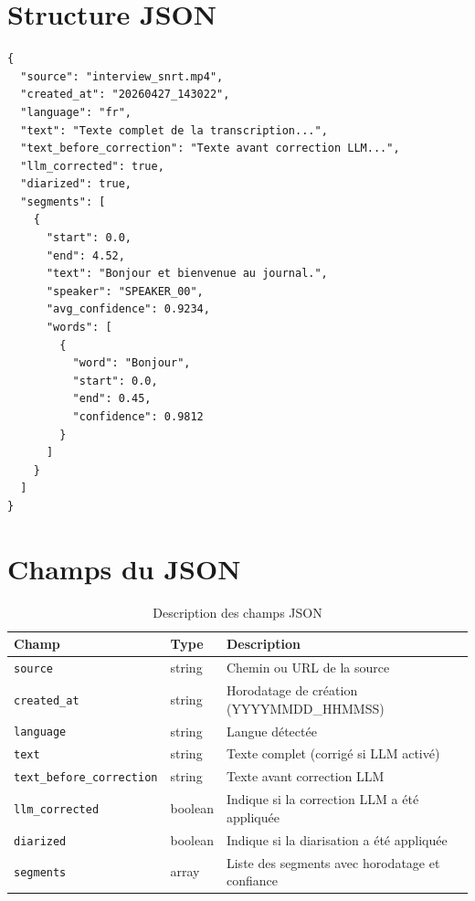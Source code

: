 \documentclass[12pt,a4paper]{report}
\begin{document}
\section{Structure JSON}

\begin{lstlisting}[title=Exemple de fichier JSON de sortie]
{
  "source": "interview_snrt.mp4",
  "created_at": "20260427_143022",
  "language": "fr",
  "text": "Texte complet de la transcription...",
  "text_before_correction": "Texte avant correction LLM...",
  "llm_corrected": true,
  "diarized": true,
  "segments": [
    {
      "start": 0.0,
      "end": 4.52,
      "text": "Bonjour et bienvenue au journal.",
      "speaker": "SPEAKER_00",
      "avg_confidence": 0.9234,
      "words": [
        {
          "word": "Bonjour",
          "start": 0.0,
          "end": 0.45,
          "confidence": 0.9812
        }
      ]
    }
  ]
}
\end{lstlisting}

\section{Champs du JSON}

\begin{table}[H]
    \centering
    \caption{Description des champs JSON}
    \label{tab:json_fields}
    \begin{tabular}{@{} l l p{6cm} @{}}
        \toprule
        \textbf{Champ} & \textbf{Type} & \textbf{Description} \\
        \midrule
        \texttt{source} & string & Chemin ou URL de la source \\
        \texttt{created\_at} & string & Horodatage de création (YYYYMMDD\_HHMMSS) \\
        \texttt{language} & string & Langue détectée \\
        \texttt{text} & string & Texte complet (corrigé si LLM activé) \\
        \texttt{text\_before\_correction} & string & Texte avant correction LLM \\
        \texttt{llm\_corrected} & boolean & Indique si la correction LLM a été appliquée \\
        \texttt{diarized} & boolean & Indique si la diarisation a été appliquée \\
        \texttt{segments} & array & Liste des segments avec horodatage et confiance \\
        \bottomrule
    \end{tabular}
\end{table}
\end{document}
